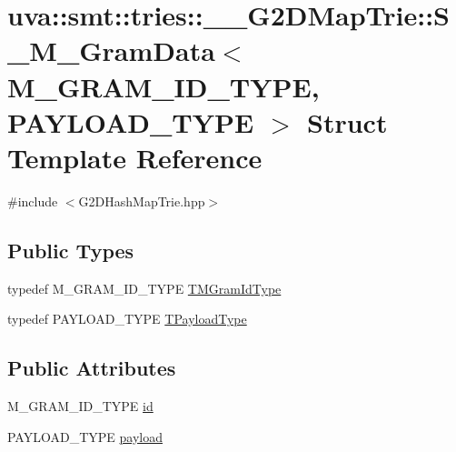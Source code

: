 \hypertarget{structuva_1_1smt_1_1tries_1_1_____g2_d_map_trie_1_1_s___m___gram_data}{}\section{uva\+:\+:smt\+:\+:tries\+:\+:\+\_\+\+\_\+\+G2\+D\+Map\+Trie\+:\+:S\+\_\+\+M\+\_\+\+Gram\+Data$<$ M\+\_\+\+G\+R\+A\+M\+\_\+\+I\+D\+\_\+\+T\+Y\+P\+E, P\+A\+Y\+L\+O\+A\+D\+\_\+\+T\+Y\+P\+E $>$ Struct Template Reference}
\label{structuva_1_1smt_1_1tries_1_1_____g2_d_map_trie_1_1_s___m___gram_data}


{\ttfamily \#include $<$G2\+D\+Hash\+Map\+Trie.\+hpp$>$}

\subsection*{Public Types}
\begin{DoxyCompactItemize}
\item 
typedef M\+\_\+\+G\+R\+A\+M\+\_\+\+I\+D\+\_\+\+T\+Y\+P\+E \hyperlink{structuva_1_1smt_1_1tries_1_1_____g2_d_map_trie_1_1_s___m___gram_data_a7dcd525c09a87470c75a0a379fda3ade}{T\+M\+Gram\+Id\+Type}
\item 
typedef P\+A\+Y\+L\+O\+A\+D\+\_\+\+T\+Y\+P\+E \hyperlink{structuva_1_1smt_1_1tries_1_1_____g2_d_map_trie_1_1_s___m___gram_data_a5c1027f58b9390886c4002f3b58d3e96}{T\+Payload\+Type}
\end{DoxyCompactItemize}
\subsection*{Public Attributes}
\begin{DoxyCompactItemize}
\item 
M\+\_\+\+G\+R\+A\+M\+\_\+\+I\+D\+\_\+\+T\+Y\+P\+E \hyperlink{structuva_1_1smt_1_1tries_1_1_____g2_d_map_trie_1_1_s___m___gram_data_a3a7ce360e1a56c5b9f067a66de90c300}{id}
\item 
P\+A\+Y\+L\+O\+A\+D\+\_\+\+T\+Y\+P\+E \hyperlink{structuva_1_1smt_1_1tries_1_1_____g2_d_map_trie_1_1_s___m___gram_data_a3dcc7bf22bca173a149dff6c1aac9ab1}{payload}
\end{DoxyCompactItemize}
